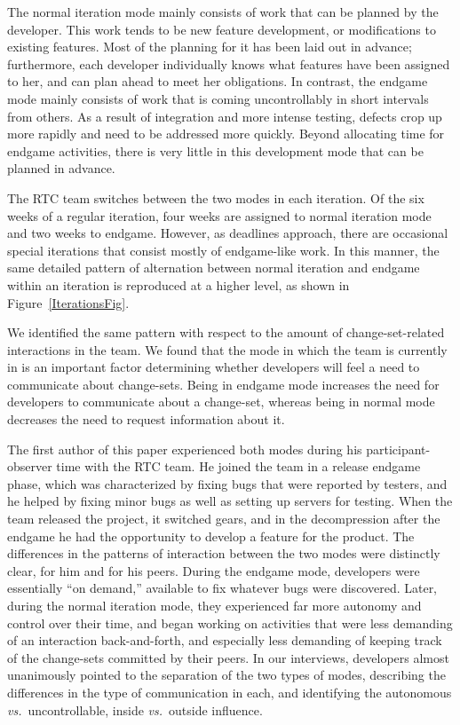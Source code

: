 The normal iteration mode mainly consists of work that can be planned by the developer. This work tends to be new feature development, or modifications to existing features. Most of the planning for it has been laid out in advance; furthermore, each developer individually knows what features have been assigned to her, and can plan ahead to meet her obligations.
In contrast, the endgame mode mainly consists of work that is coming uncontrollably in short intervals from others. As a result of integration and more intense testing, defects crop up more rapidly and need to be addressed more quickly. Beyond allocating time for endgame activities, there is very little in this development mode that can be planned in advance.

The RTC team switches between the two modes in each iteration. Of the six weeks of a regular iteration, four weeks are assigned to normal iteration mode and two weeks to endgame. However, as deadlines approach, there are occasional special iterations that consist mostly of endgame-like work. In this manner, the same detailed pattern of alternation between normal iteration and endgame within an iteration is reproduced at a higher level, as shown in Figure~\ref{IterationsFig}.

We identified the same pattern with respect to the amount of change-set-related interactions in the team. We found that the mode in which the team is currently in is an important factor determining whether developers will feel a need to communicate about change-sets. Being in endgame mode increases the need for developers to communicate about a change-set, whereas being in normal mode decreases the need to request information about it.

The first author of this paper experienced both modes during his participant-observer time with the RTC team. He joined the team in a release endgame phase, which was characterized by fixing bugs that were reported by testers, and he helped by fixing minor bugs as well as setting up servers for testing. When the team released the project, it switched gears, and in the decompression after the endgame he had the opportunity to develop a feature for the product. The differences in the patterns of interaction between the two modes were distinctly clear, for him and for his peers. During the endgame mode, developers were essentially ``on demand,'' available to fix whatever bugs were discovered. Later, during the normal iteration mode, they experienced far more autonomy and control over their time, and began working on activities that were less demanding of an interaction back-and-forth, and especially less demanding of keeping track of the change-sets committed by their peers. In our interviews, developers almost unanimously pointed to the separation of the two types of modes, describing the differences in the type of communication in each, and identifying the autonomous \emph{vs.}~uncontrollable, inside \emph{vs.}~outside influence.

